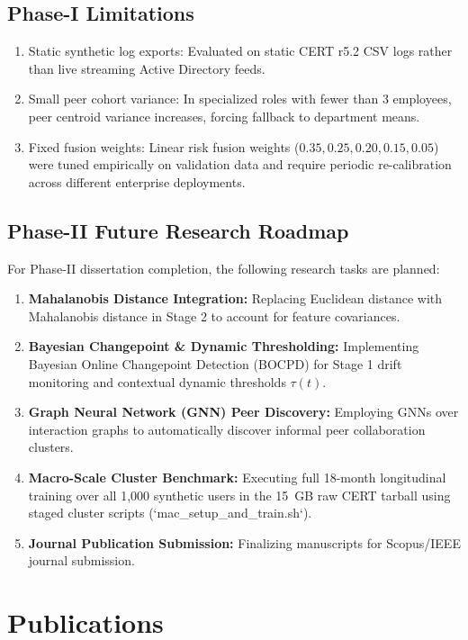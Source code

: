 \documentclass[12pt,a4paper]{report}
\begin{document}
\section{Phase-I Limitations}
\begin{enumerate}
    \item Static synthetic log exports: Evaluated on static CERT r5.2 CSV logs rather than live streaming Active Directory feeds.
    \item Small peer cohort variance: In specialized roles with fewer than 3 employees, peer centroid variance increases, forcing fallback to department means.
    \item Fixed fusion weights: Linear risk fusion weights ($0.35, 0.25, 0.20, 0.15, 0.05$) were tuned empirically on validation data and require periodic re-calibration across different enterprise deployments.
\end{enumerate}

\section{Phase-II Future Research Roadmap}
For Phase-II dissertation completion, the following research tasks are planned:
\begin{enumerate}
    \item \textbf{Mahalanobis Distance Integration:} Replacing Euclidean distance with Mahalanobis distance in Stage 2 to account for feature covariances.
    \item \textbf{Bayesian Changepoint \& Dynamic Thresholding:} Implementing Bayesian Online Changepoint Detection (BOCPD) for Stage 1 drift monitoring and contextual dynamic thresholds $\tau(t)$.
    \item \textbf{Graph Neural Network (GNN) Peer Discovery:} Employing GNNs over interaction graphs to automatically discover informal peer collaboration clusters.
    \item \textbf{Macro-Scale Cluster Benchmark:} Executing full 18-month longitudinal training over all 1,000 synthetic users in the 15~GB raw CERT tarball using staged cluster scripts (`mac_setup_and_train.sh`).
    \item \textbf{Journal Publication Submission:} Finalizing manuscripts for Scopus/IEEE journal submission.
\end{enumerate}

\chapter{Publications}
\label{chap:publications}
\end{document}
